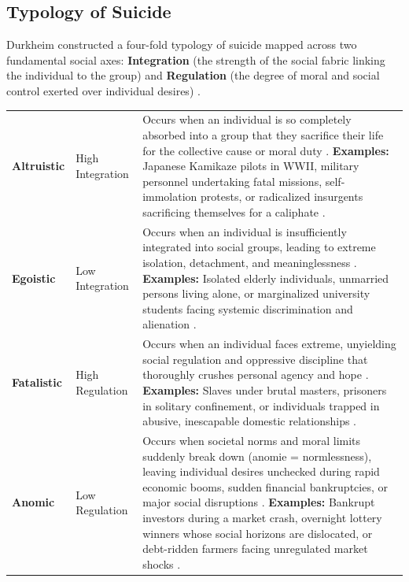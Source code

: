 \subsection{Typology of Suicide}

Durkheim constructed a four-fold typology of suicide mapped across two fundamental social axes: \textbf{Integration} (the strength of the social fabric linking the individual to the group) and \textbf{Regulation} (the degree of moral and social control exerted over individual desires) .

\begin{table}[htbp]
\centering
\small
\begin{tabularx}{\textwidth}{l l Y}
\toprule
{}
 &  &  \\
\midrule
\textbf{Altruistic} & High Integration & Occurs when an individual is so completely absorbed into a group that they sacrifice their life for the collective cause or moral duty . \newline \textbf{Examples:} Japanese Kamikaze pilots in WWII, military personnel undertaking fatal missions, self-immolation protests, or radicalized insurgents sacrificing themselves for a caliphate . \\
\textbf{Egoistic} & Low Integration & Occurs when an individual is insufficiently integrated into social groups, leading to extreme isolation, detachment, and meaninglessness . \newline \textbf{Examples:} Isolated elderly individuals, unmarried persons living alone, or marginalized university students facing systemic discrimination and alienation . \\
\textbf{Fatalistic} & High Regulation & Occurs when an individual faces extreme, unyielding social regulation and oppressive discipline that thoroughly crushes personal agency and hope . \newline \textbf{Examples:} Slaves under brutal masters, prisoners in solitary confinement, or individuals trapped in abusive, inescapable domestic relationships . \\
\textbf{Anomic} & Low Regulation & Occurs when societal norms and moral limits suddenly break down (anomie = normlessness), leaving individual desires unchecked during rapid economic booms, sudden financial bankruptcies, or major social disruptions . \newline \textbf{Examples:} Bankrupt investors during a market crash, overnight lottery winners whose social horizons are dislocated, or debt-ridden farmers facing unregulated market shocks . \\
\bottomrule
\end{tabularx}
\end{table}

